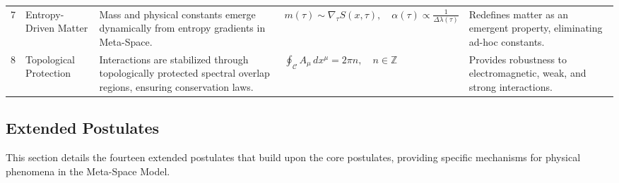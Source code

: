 \documentclass[10.5pt,a4paper]{article}
\begin{document}
{\begin{longtable}{p{0.5cm} p{1.75cm} p{4.5cm} p{5cm} p{4.5cm}}
7 & Entropy-Driven Matter & Mass and physical constants emerge dynamically from entropy gradients in Meta-Space. & 
\( m(\tau) \sim \nabla_\tau S(x, \tau), \quad \alpha(\tau) \propto \frac{1}{\Delta \lambda(\tau)} \) & Redefines matter as an emergent property, eliminating ad-hoc constants. \\

8 & Topological Protection & Interactions are stabilized through topologically protected spectral overlap regions, ensuring conservation laws. & 
\( \oint_{\mathcal{C}} A_\mu \, dx^\mu = 2\pi n, \quad n \in \mathbb{Z} \) & Provides robustness to electromagnetic, weak, and strong interactions. \\

\end{longtable}
}
\subsection{Extended Postulates}
This section details the fourteen extended postulates that build upon the core postulates, providing specific mechanisms for physical phenomena in the Meta-Space Model.
\end{document}
